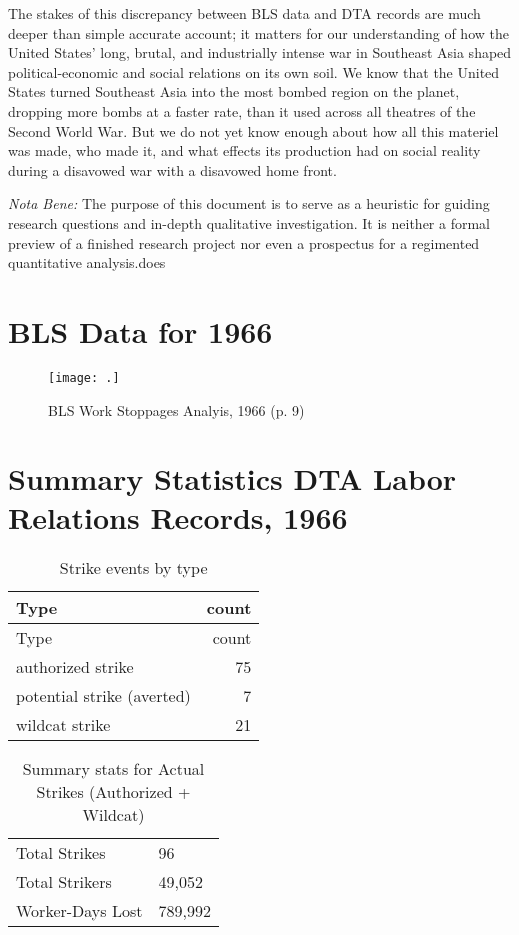 \documentclass[
]{article}
\begin{document}
The stakes of this discrepancy between BLS data and DTA records are much
deeper than simple accurate account; it matters for our understanding of
how the United States' long, brutal, and industrially intense war in
Southeast Asia shaped political-economic and social relations on its own
soil. We know that the United States turned Southeast Asia into the most
bombed region on the planet, dropping more bombs at a faster rate, than
it used across all theatres of the Second World War. But we do not yet
know enough about how all this materiel was made, who made it, and what
effects its production had on social reality during a disavowed war with
a disavowed home front.

\emph{Nota Bene:} The purpose of this document is to serve as a
heuristic for guiding research questions and in-depth qualitative
investigation. It is neither a formal preview of a finished research
project nor even a prospectus for a regimented quantitative
analysis.does

\newpage

\section{BLS Data for 1966}\label{bls-data-for-1966}

\begin{figure}
\texttt{[image: .]} \caption{BLS Work Stoppages Analyis, 1966 (p. 9)}\label{fig:bls}
\end{figure}
\newpage

\section{Summary Statistics DTA Labor Relations Records,
1966}\label{summary-statistics-dta-labor-relations-records-1966}

\begin{longtable}[]{@{}lr@{}}
\caption{Strike events by type}\tabularnewline
\toprule\noalign{}
Type & count \\
\midrule\noalign{}
\endfirsthead
\toprule\noalign{}
Type & count \\
\midrule\noalign{}
\endhead
\bottomrule\noalign{}
\endlastfoot
authorized strike & 75 \\
potential strike (averted) & 7 \\
wildcat strike & 21 \\
\end{longtable}

\begin{longtable}[]{@{}ll@{}}
\caption{Summary stats for Actual Strikes (Authorized +
Wildcat)}\tabularnewline
\toprule\noalign{}
\endfirsthead
\endhead
\bottomrule\noalign{}
\endlastfoot
Total Strikes & 96 \\
Total Strikers & 49,052 \\
Worker-Days Lost & 789,992 \\
\end{longtable}
\end{document}

